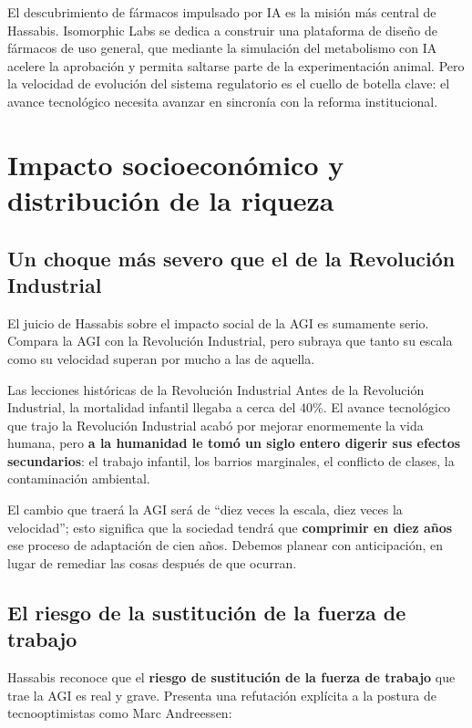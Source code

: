 \documentclass[a4paper]{article}
\begin{document}
El descubrimiento de fármacos impulsado por IA es la misión más central de Hassabis. Isomorphic Labs se dedica a construir una plataforma de diseño de fármacos de uso general, que mediante la simulación del metabolismo con IA acelere la aprobación y permita saltarse parte de la experimentación animal. Pero la velocidad de evolución del sistema regulatorio es el cuello de botella clave: el avance tecnológico necesita avanzar en sincronía con la reforma institucional.

\section{Impacto socioeconómico y distribución de la riqueza}

\subsection{Un choque más severo que el de la Revolución Industrial}

El juicio de Hassabis sobre el impacto social de la AGI es sumamente serio. Compara la AGI con la Revolución Industrial, pero subraya que tanto su escala como su velocidad superan por mucho a las de aquella.

\begin{importantbox}{Las lecciones históricas de la Revolución Industrial}
Antes de la Revolución Industrial, la mortalidad infantil llegaba a cerca del 40\%. El avance tecnológico que trajo la Revolución Industrial acabó por mejorar enormemente la vida humana, pero \textbf{a la humanidad le tomó un siglo entero digerir sus efectos secundarios}: el trabajo infantil, los barrios marginales, el conflicto de clases, la contaminación ambiental.

El cambio que traerá la AGI será de ``diez veces la escala, diez veces la velocidad''; esto significa que la sociedad tendrá que \textbf{comprimir en diez años} ese proceso de adaptación de cien años. Debemos planear con anticipación, en lugar de remediar las cosas después de que ocurran.
\end{importantbox}

\subsection{El riesgo de la sustitución de la fuerza de trabajo}

Hassabis reconoce que el \textbf{riesgo de sustitución de la fuerza de trabajo} que trae la AGI es real y grave. Presenta una refutación explícita a la postura de tecnooptimistas como Marc Andreessen:
\end{document}
